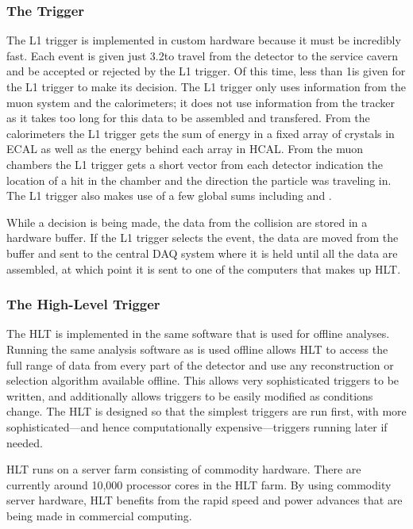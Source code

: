 \subsubsection{The \Lone Trigger}

The L1 trigger is implemented in custom hardware because it must be incredibly
fast. Each event is given just 3.2\microseconds to travel from the detector to
the service cavern and be accepted or rejected by the L1 trigger. Of this time,
less than 1\microseconds is given for the L1 trigger to make its decision. The
L1 trigger only uses information from the muon system and the calorimeters; it
does not use information from the tracker as it takes too long for this
data to be assembled and transfered. From the calorimeters the L1 trigger gets
the sum of energy in a fixed array of \fivebyfive crystals in ECAL as well as
the energy behind each array in HCAL. From the muon chambers the L1 trigger
gets a short vector from each detector indication the location of a hit in the
chamber and the direction the particle was traveling in. The L1 trigger also
makes use of a few global sums including \ET and \MET.

While a decision is being made, the data from the collision are stored in a
hardware buffer. If the L1 trigger selects the event, the data are moved from
the buffer and sent to the central DAQ system where it is held until all the
data are assembled, at which point it is sent to one of the computers that makes
up HLT.

\subsubsection{The High-Level Trigger}

The HLT is implemented in the same software that is used for offline analyses.
Running the same analysis software as is used offline allows HLT to access the
full range of data from every part of the detector and use any reconstruction
or selection algorithm available offline. This allows very sophisticated
triggers to be written, and additionally allows triggers to be easily modified
as conditions change. The HLT is designed so that the simplest triggers are run
first, with more sophisticated---and hence computationally expensive---triggers
running later if needed.

HLT runs on a server farm consisting of commodity hardware. There are currently
around 10,000 processor cores in the HLT farm. By using commodity server
hardware, HLT benefits from the rapid speed and power advances that are being
made in commercial computing.
